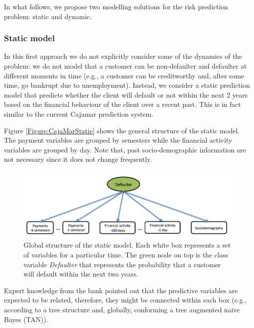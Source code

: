 In what follows, we propose two modelling solutions for the risk prediction problem: static and dynamic.

\subsubsection*{Static model} 

In this first approach we do not explicitly consider some of the dynamics of the problem: we do not model that a customer can be non-defaulter and defaulter at different moments in time (e.g., a customer can be creditworthy and, after some time, go bankrupt due to unemployment). Instead, we consider a static prediction model that predicts whether the client will default or not within the next 2 years based on the financial behaviour of the client over a recent past. This is in fact similar to the current Cajamar prediction system. 

Figure \ref{Figure:CajaMarStatic} shows the general structure of the static model. The payment variables are grouped by semesters while the financial activity variables are grouped by day. Note that, past socio-demographic information are not necessary since it does not change frequently.

\begin{figure}[htbp]
  \centering
\includegraphics[scale=0.5]{./figures/CajaMarModel0}
\caption{\label{Figure:CajaMarStatic}Global structure of the static model. Each white box represents a set of variables for a particular time. The green node on top is the class variable \emph{Defaulter} that represents the probability that a customer will default within the next two years. } 
\label{fig:CajamarStaticModel}
\end{figure}

Expert knowledge from the bank pointed out that the predictive variables are expected to be related, therefore, they might be connected within each box (e.g., according to a tree structure and, globally, conforming a tree augmented naive Bayes (TAN)). 


